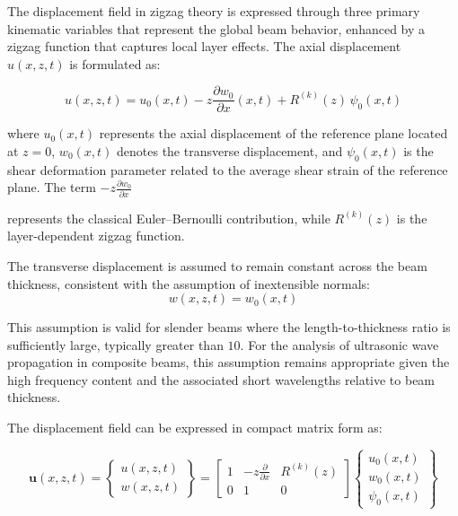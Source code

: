 \documentclass[12pt,a4paper]{report}
\begin{document}
The displacement field in zigzag theory is expressed through three primary kinematic variables that represent the global beam behavior, enhanced by a zigzag function that captures local layer effects. The axial displacement $u(x,z,t)$ is formulated as:

\begin{equation}
    u(x,z,t) = u_0(x,t) - z \frac{\partial w_0}{\partial x}(x,t) + R^{(k)}(z) \, \psi_0(x,t)
\end{equation}


where \(u_0(x,t)\) represents the axial displacement of the reference plane located at \(z = 0\), \(w_0(x,t)\) denotes the transverse displacement, and \(\psi_0(x,t)\) is the shear deformation parameter related to the average shear strain of the reference plane. The term \(- z \frac{\partial w_0}{\partial x}\)

represents the classical Euler--Bernoulli contribution, while $R^{(k)}(z)$ is the layer-dependent zigzag function.

The transverse displacement is assumed to remain constant across the beam thickness, consistent with the assumption of inextensible normals:
\begin{equation}
   w(x,z,t) = w_0(x,t) 
\end{equation}


This assumption is valid for slender beams where the length-to-thickness ratio is sufficiently large, typically greater than $10$. For the analysis of ultrasonic wave propagation in composite beams, this assumption remains appropriate given the high frequency content and the associated short wavelengths relative to beam thickness.

The displacement field can be expressed in compact matrix form as:

\begin{equation}
\mathbf{u}(x,z,t) = 
\begin{Bmatrix}
u(x,z,t) \\
w(x,z,t)
\end{Bmatrix}
=
\begin{bmatrix}
1 & -z\frac{\partial }{\partial x} & R^{(k)}(z) \\
0 & 1 & 0
\end{bmatrix}
\begin{Bmatrix}
u_0(x,t) \\
w_0(x,t) \\
\psi_0(x,t)
\end{Bmatrix}
\end{equation}
\end{document}
